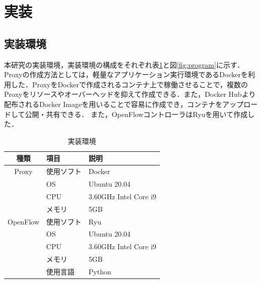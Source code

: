 \documentclass[Japanese]{dicomopapers}
\begin{document}
\section{実装}
\subsection{実装環境}
本研究の実装環境，実装環境の構成をそれぞれ表\ref{tab:program}と図\ref{fig:program}に示す．Proxyの作成方法としては，軽量なアプリケーション実行環境であるDockerを利用した．ProxyをDockerで作成されるコンテナ上で稼働させることで，複数のProxyをリソースやオーバーヘッドを抑えて作成できる．また，Docker Hubより配布されるDocker Imageを用いることで容易に作成でき，コンテナをアップロードして公開・共有できる．
また，OpenFlowコントローラはRyuを用いて作成した．

\begin{table}[!bt]
	\caption{実装環境}
	\label{tab:program}
	\centering
	\begin{tabular}{c|l|l}
		\hline
		種類     & 項目       & 説明                  \\
		\hline \hline
		Proxy    & 使用ソフト & Docker                \\
		         & OS         & Ubuntu 20.04          \\
		         & CPU        & 3.60GHz Intel Core i9 \\
		         & メモリ     & 5GB                   \\
		\hline
		OpenFlow & 使用ソフト & Ryu                   \\
		         & OS         & Ubuntu 20.04          \\
		         & CPU        & 3.60GHz Intel Core i9 \\
		         & メモリ     & 5GB                   \\
		         & 使用言語   & Python                \\
		\hline
	\end{tabular}
\end{table}
\end{document}
